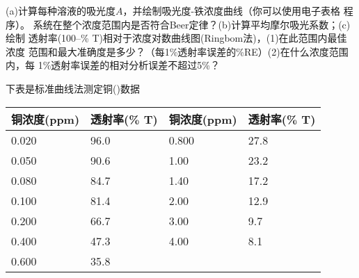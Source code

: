 \begin{problemset}
    (a)计算每种溶液的吸光度$A$，并绘制吸光度-铁浓度曲线（你可以使用电子表格
    程序）。
    系统在整个浓度范围内是否符合Beer定律？(b)计算平均摩尔吸光系数；(c)绘制
    透射率(100--\% T)相对于浓度对数曲线图(Ringbom法)，(1)在此范围内最佳浓度
    范围和最大准确度是多少？（每1\%透射率误差的\%RE）(2)在什么浓度范围内，每
    1\%透射率误差的相对分析误差不超过5\%？
\item 下表是标准曲线法测定铜()数据
    \begin{table}[htbp]
        \centering
        \begin{tabular}{llll}
            \hline
            铜浓度(ppm)&透射率(\% T)&铜浓度(ppm)&透射率(\% T)\\
            \hline
            0.020 & 96.0 & 0.800 & 27.8 \\
            0.050 & 90.6 & 1.00 & 23.2 \\
            0.080 & 84.7 & 1.40 & 17.2 \\
            0.100 & 81.4 & 2.00 & 12.9 \\
            0.200 & 66.7 & 3.00 & 9.7 \\
            0.400 & 47.3 & 4.00 & 8.1 \\
            0.600 & 35.8 &  &  \\
            \hline
        \end{tabular}
    \end{table}


\end{problemset}
